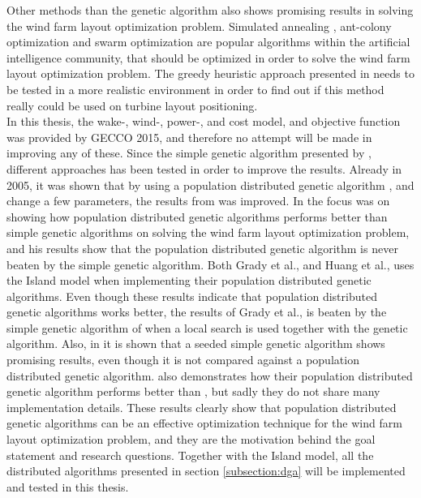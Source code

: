 \noindent Other methods than the genetic algorithm also shows promising results in solving the wind farm layout optimization problem. Simulated annealing \citep{Bilbao}, ant-colony optimization \citep{Eroglu} and swarm optimization \citep{Wan2012} are popular algorithms within the artificial intelligence community, that should be optimized in order to solve the wind farm layout optimization problem. The greedy heuristic approach presented in \citep{Ozturk} needs to be tested in a more realistic environment in order to find out if this method really could be used on turbine layout positioning.\\

\noindent In this thesis, the wake-, wind-, power-, and cost model, and objective function was provided by GECCO 2015, and therefore no attempt will be made in improving any of these. Since the simple genetic algorithm presented by \citep{Mosetti}, different approaches has been tested in order to improve the results. Already in 2005, it was shown that by using a population distributed genetic algorithm \citep{Grady}, and change a few parameters, the results from \citep{Mosetti} was improved. In \citep{Huang} the focus was on showing how population distributed genetic algorithms performs better than simple genetic algorithms on solving the wind farm layout optimization problem, and his results show that the population distributed genetic algorithm is never beaten by the simple genetic algorithm. Both Grady et al., and Huang et al., uses the Island model when implementing their population distributed genetic algorithms. Even though these results indicate that population distributed genetic algorithms works better, the results of Grady et al., is beaten by the simple genetic algorithm of \cite{Gonzalez} when a local search is used together with the genetic algorithm. Also, in \citep{Saavedra-Morena} it is shown that a seeded simple genetic algorithm shows promising results, even though it is not compared against a population distributed genetic algorithm. \cite{Gao} also demonstrates how their population distributed genetic algorithm performs better than \citep{Mosetti, Grady, Gonzalez, Wan}, but sadly they do not share many implementation details. These results clearly show that population distributed genetic algorithms can be an effective optimization technique for the wind farm layout optimization problem, and they are the motivation behind the goal statement and research questions. Together with the Island model, all the distributed algorithms presented in section \ref{subsection:dga} will be implemented and tested in this thesis.\\



